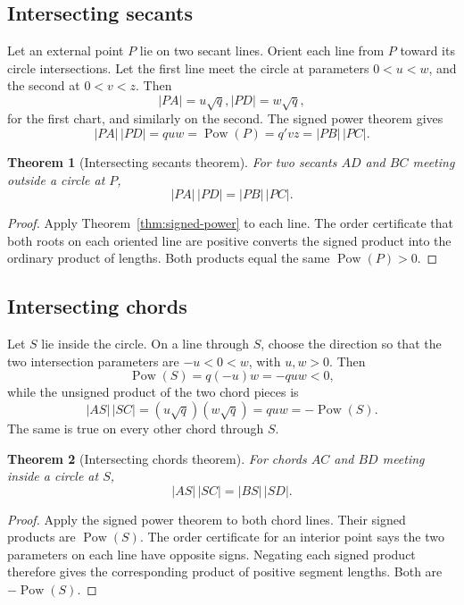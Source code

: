 \documentclass[11pt,letterpaper]{article}
\newtheorem{theorem}{Theorem}[section]
\theoremstyle{definition}
\theoremstyle{remark}
\newcommand{\Pow}{\operatorname{Pow}}
\begin{document}
\subsection{Intersecting secants}

Let an external point \(P\) lie on two secant lines.  Orient each line from
\(P\) toward its circle intersections.  Let the first line meet the circle at
parameters \(0<u<w\), and the second at \(0<v<z\).  Then
\[
 |PA|=u\sqrt q,
 |PD|=w\sqrt q,
\]
for the first chart, and similarly on the second.  The signed power theorem
gives
\[
 |PA|\,|PD|=q uw=\Pow(P)=q'vz=|PB|\,|PC|.
\]

\begin{theorem}[Intersecting secants theorem]
\label{thm:secants}
For two secants \(AD\) and \(BC\) meeting outside a circle at \(P\),
\[
 |PA|\,|PD|=|PB|\,|PC|.
 \tag{8.1}\label{eq:secants}
\]
\end{theorem}

\begin{proof}
Apply Theorem~\ref{thm:signed-power} to each line.  The order certificate that
both roots on each oriented line are positive converts the signed product into
the ordinary product of lengths.  Both products equal the same
\(\Pow(P)>0\).
\end{proof}

\subsection{Intersecting chords}

Let \(S\) lie inside the circle.  On a line through \(S\), choose the direction
so that the two intersection parameters are \(-u<0<w\), with \(u,w>0\).
Then
\[
 \Pow(S)=q(-u)w=-q uw<0,
\]
while the unsigned product of the two chord pieces is
\[
 |AS|\,|SC|=(u\sqrt q)(w\sqrt q)=quw=-\Pow(S).
\]
The same is true on every other chord through \(S\).

\begin{theorem}[Intersecting chords theorem]
\label{thm:chords}
For chords \(AC\) and \(BD\) meeting inside a circle at \(S\),
\[
 |AS|\,|SC|=|BS|\,|SD|.
 \tag{8.2}\label{eq:chords}
\]
\end{theorem}

\begin{proof}
Apply the signed power theorem to both chord lines.  Their signed products are
\(\Pow(S)\).  The order certificate for an interior point says the two
parameters on each line have opposite signs.  Negating each signed product
therefore gives the corresponding product of positive segment lengths.  Both
are \(-\Pow(S)\).
\end{proof}
\end{document}
